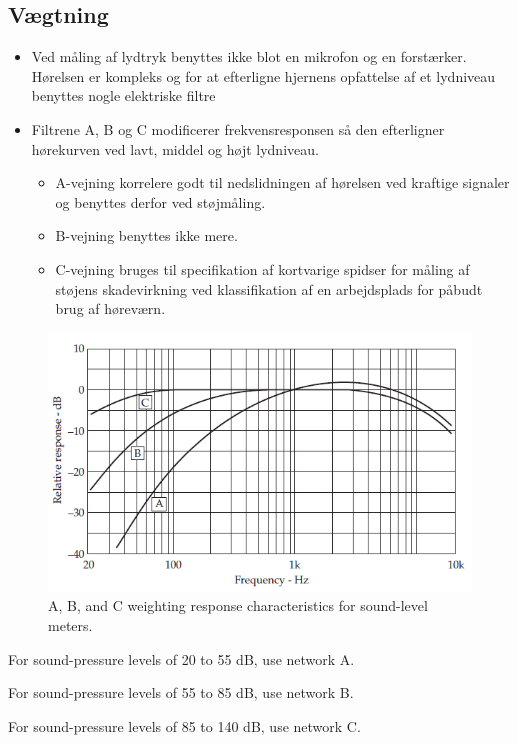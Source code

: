\subsection{Vægtning}
\begin{itemize}
	\item Ved måling af lydtryk benyttes ikke blot en mikrofon og en forstærker. Hørelsen er kompleks og for at efterligne hjernens opfattelse af et lydniveau benyttes nogle elektriske filtre
	\item Filtrene A, B og C modificerer frekvensresponsen så den efterligner hørekurven ved lavt, middel og højt lydniveau.
	\begin{itemize}
		\item A-vejning korrelere godt til nedslidningen af hørelsen ved kraftige signaler og benyttes derfor ved støjmåling.
		\item B-vejning benyttes ikke mere.
		\item C-vejning bruges til specifikation af kortvarige spidser for måling af støjens skadevirkning ved klassifikation af en arbejdsplads for påbudt brug af høreværn.
	\end{itemize}
\end{itemize}

\begin{figure} [H]
	\centering
	\includegraphics[width=\linewidth]{graphics/7.png}
	\caption{A, B, and C weighting response characteristics for sound-level meters.}
	\label{fig:7}
\end{figure}

\begin{description}
	\item For sound-pressure levels of 20 to 55 dB, use network A.
	\item For sound-pressure levels of 55 to 85 dB, use network B.
	\item For sound-pressure levels of 85 to 140 dB, use network C.
\end{description}


